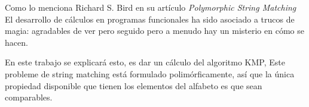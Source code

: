 Como lo menciona Richard S. Bird en su artículo \emph{Polymorphic String Matching}\cite{book:1505279}
El desarrollo de cálculos en programas funcionales ha sido asociado a trucos de magia: agradables de ver pero seguido pero a menudo hay un misterio en cómo se hacen.

En este trabajo se explicará esto, es dar un cálculo del algoritmo KMP,
Este probleme de string matching está formulado polimórficamente, así que la única propiedad disponible que tienen los elementos del alfabeto es que sean comparables.


